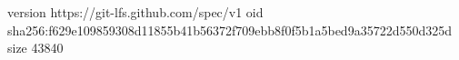 version https://git-lfs.github.com/spec/v1
oid sha256:f629e109859308d11855b41b56372f709ebb8f0f5b1a5bed9a35722d550d325d
size 43840
